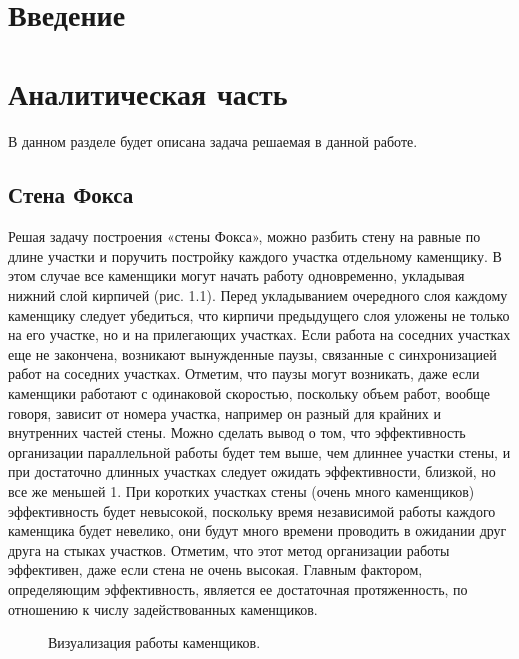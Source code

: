 \documentclass[12pt,a4paper]{report}
\begin{document}
	
	\tableofcontents
	
	
	\newpage
	\chapter*{Введение}
	
	\newpage
	\chapter{Аналитическая часть}
	
В данном разделе будет описана задача решаемая в данной работе.
	
\section{Стена Фокса}
	
	Решая задачу построения «стены Фокса», можно разбить
	стену на равные по длине участки и поручить постройку каждого участка отдельному каменщику. В этом случае все каменщики могут начать работу одновременно, укладывая нижний слой кирпичей (рис.
	1.1). Перед укладыванием очередного слоя каждому каменщику следует убедиться, что кирпичи предыдущего слоя уложены не только на
	его участке, но и на прилегающих участках. Если работа на соседних
	участках еще не закончена, возникают вынужденные паузы, связанные
	с синхронизацией работ на соседних участках. Отметим, что паузы
	могут возникать, даже если каменщики работают с одинаковой скоростью, поскольку объем работ, вообще говоря, зависит от номера участка, например он разный для крайних и внутренних частей стены.
	Можно сделать вывод о том, что эффективность организации
	параллельной работы будет тем выше, чем длиннее участки стены, и
	при достаточно длинных участках следует ожидать эффективности,
	близкой, но все же меньшей 1. При коротких участках стены (очень
	много каменщиков) эффективность будет невысокой, поскольку время
	независимой работы каждого каменщика будет невелико, они будут
	много времени проводить в ожидании друг друга на стыках участков.
	Отметим, что этот метод организации работы эффективен,
	даже если стена не очень высокая. Главным фактором, определяющим
	эффективность, является ее достаточная протяженность, по отношению к числу задействованных каменщиков.
	
	
	
	
	\begin{figure}[h!]
		\caption{Визуализация работы каменщиков.}
		\label{fig:image}
	\end{figure}
	
\end{document}
